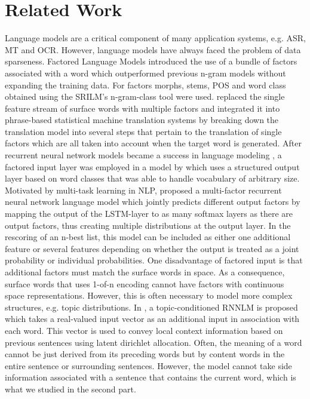 \documentclass[a4paper]{article}
\begin{document}
\section{Related Work}
Language models are a critical component of many application systems, e.g. ASR, MT and OCR. However, language models have always faced the problem of data sparseness. Factored Language Models \cite{bilmes2003factored} introduced the use of a bundle of factors associated with a word which outperformed previous n-gram models without expanding the training data. For factors morphs, stems, POS and word class obtained using the SRILM's n-gram-class tool were used. \cite{koehn2007factored} replaced the single feature stream of surface words with multiple factors and integrated it into phrase-based statistical machine translation systems by breaking down the translation model into several steps that pertain to the translation of single factors which are all taken into account when the target word is generated.
After recurrent neural network models became a success in language modeling \cite{mikolov2010recurrent}, a factored input layer was employed in a model by \cite{wu2012factored} which uses a structured output layer based on word classes that was able to handle vocabulary of arbitrary size.
Motivated by multi-task learning in NLP, \cite{niehuesusing} proposed a multi-factor recurrent neural network language model which jointly predicts different output factors by mapping the output of the LSTM-layer to as many softmax layers as there are output factors, thus creating multiple distributions at the output layer. In the rescoring of an n-best list, this model can be included as either one additional feature or several features depending on whether the output is treated as a joint probability or individual probabilities.
One disadvantage of factored input is that additional factors must match the surface words in space. As a consequence, surface words that uses 1-of-n encoding cannot have factors with continuous space representations.
However, this is often necessary to model more complex structures, e.g. topic distributions. 
In \cite{mikolov2012context}, a topic-conditioned RNNLM is proposed which takes a real-valued input vector as an additional input in association with each word. This vector is used to convey local context information based on previous sentences using latent dirichlet allocation.
Often, the meaning of a word cannot be just derived from its preceding words but by content words in the entire sentence or surrounding sentences. 
However, the model cannot take side information associated with a sentence that contains the current word, which is what we studied in the second part.
\end{document}
